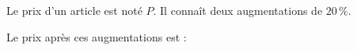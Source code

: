 
Le prix d'un article est noté $P$. Il connaît deux augmentations de $20\,\%$.

Le prix après ces augmentations est :

\smallskip

